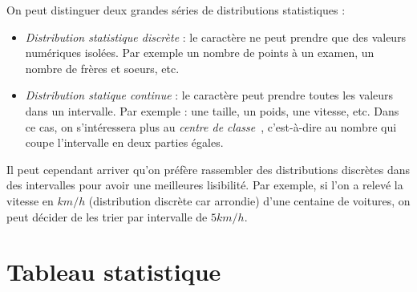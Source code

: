 \begin{remarque}
On peut distinguer deux grandes séries de distributions statistiques :
\begin{itemize}
\item \emph{Distribution statistique discrète} : le caractère ne peut prendre que des valeurs numériques isolées. Par exemple un nombre de points à un examen, un nombre de frères et soeurs, etc.
\item \emph{Distribution statique continue} : le caractère peut prendre toutes les valeurs dans un intervalle. Par exemple : une taille, un poids, une vitesse, etc. Dans ce cas, on s'intéressera plus au \emph{centre de classe}~, c'est-à-dire au nombre qui coupe l'intervalle en deux parties égales.
\end{itemize}
Il peut cependant arriver qu'on préfère rassembler des distributions discrètes dans des intervalles pour avoir une meilleures lisibilité. Par exemple, si l'on a relevé la vitesse en $km/h$ (distribution discrète car arrondie) d'une centaine de voitures, on peut décider de les trier par intervalle de $5km/h$.
\end{remarque}

\section{Tableau statistique}

